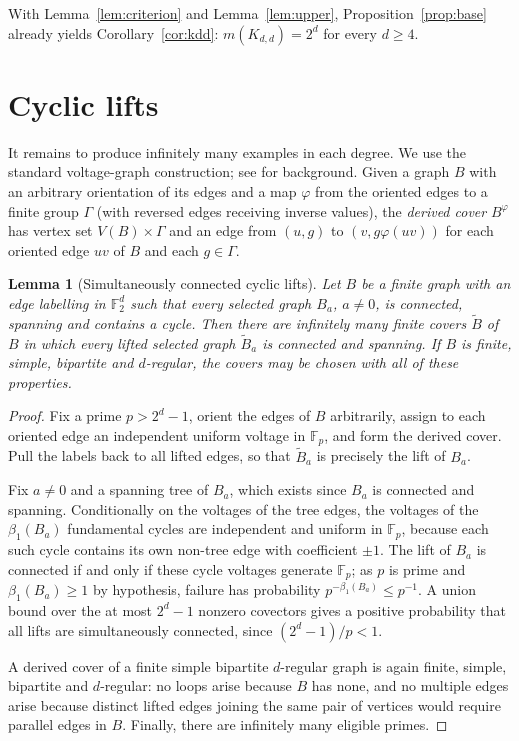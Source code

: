 \documentclass[11pt,reqno]{amsart}
\theoremstyle{plain}
\newtheorem{lemma}[theorem]{Lemma}
\theoremstyle{definition}
\newcommand{\FF}{\mathbb{F}}
\begin{document}
With Lemma~\ref{lem:criterion} and Lemma~\ref{lem:upper}, Proposition~\ref{prop:base} already yields Corollary~\ref{cor:kdd}: $m(K_{d,d})=2^{d}$ for every $d\ge 4$.

\section{Cyclic lifts}\label{sec:lifts}

It remains to produce infinitely many examples in each degree. We use the standard voltage-graph construction; see \cite{GrossTucker} for background. Given a graph $B$ with an arbitrary orientation of its edges and a map $\varphi$ from the oriented edges to a finite group $\Gamma$ (with reversed edges receiving inverse values), the \emph{derived cover} $B^{\varphi}$ has vertex set $V(B)\times\Gamma$ and an edge from $(u,g)$ to $(v,g\varphi(uv))$ for each oriented edge $uv$ of $B$ and each $g\in\Gamma$.

\begin{lemma}[Simultaneously connected cyclic lifts]\label{lem:lift}
Let $B$ be a finite graph with an edge labelling in $\FF_{2}^{d}$ such that every selected graph $B_{a}$, $a\ne 0$, is connected, spanning and contains a cycle. Then there are infinitely many finite covers $\widetilde{B}$ of $B$ in which every lifted selected graph $\widetilde{B}_{a}$ is connected and spanning. If $B$ is finite, simple, bipartite and $d$-regular, the covers may be chosen with all of these properties.
\end{lemma}

\begin{proof}
Fix a prime $p>2^{d}-1$, orient the edges of $B$ arbitrarily, assign to each oriented edge an independent uniform voltage in $\FF_{p}$, and form the derived cover. Pull the labels back to all lifted edges, so that $\widetilde{B}_{a}$ is precisely the lift of $B_{a}$.

Fix $a\ne 0$ and a spanning tree of $B_{a}$, which exists since $B_{a}$ is connected and spanning. Conditionally on the voltages of the tree edges, the voltages of the $\beta_{1}(B_{a})$ fundamental cycles are independent and uniform in $\FF_{p}$, because each such cycle contains its own non-tree edge with coefficient $\pm1$. The lift of $B_{a}$ is connected if and only if these cycle voltages generate $\FF_{p}$; as $p$ is prime and $\beta_{1}(B_{a})\ge 1$ by hypothesis, failure has probability $p^{-\beta_{1}(B_{a})}\le p^{-1}$. A union bound over the at most $2^{d}-1$ nonzero covectors gives a positive probability that all lifts are simultaneously connected, since $(2^{d}-1)/p<1$.

A derived cover of a finite simple bipartite $d$-regular graph is again finite, simple, bipartite and $d$-regular: no loops arise because $B$ has none, and no multiple edges arise because distinct lifted edges joining the same pair of vertices would require parallel edges in $B$. Finally, there are infinitely many eligible primes.
\end{proof}
\end{document}
